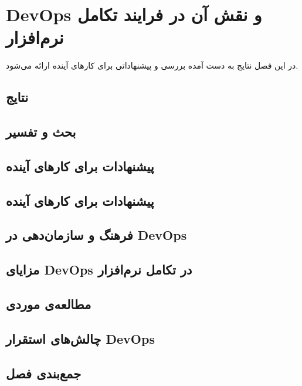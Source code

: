 \chapter{DevOps و نقش آن در فرایند تکامل نرم‌افزار}
\label{ch:conclusion}

در این فصل نتایج به دست آمده بررسی و پیشنهاداتی برای کارهای آینده ارائه می‌شود.

\section{نتایج}
\label{sec:ch3-results}


\section{بحث و تفسیر}
\label{sec:ch3-discussion}


\section{پیشنهادات برای کارهای آینده}
\label{sec:ch3-future}


\section{پیشنهادات برای کارهای آینده}
\label{sec:ch4-future}



\section{فرهنگ و سازمان‌دهی در DevOps}
\label{sec:ch3-5-culture}



\section{مزایای DevOps در تکامل نرم‌افزار}
\label{sec:ch3-6-benefits}


\section{مطالعه‌ی موردی}
\label{sec:ch3-7-case-study}


\section{چالش‌های استقرار DevOps}
\label{sec:ch3-8-challenges}


\section{جمع‌بندی فصل}
\label{sec:ch3-9-summary}

